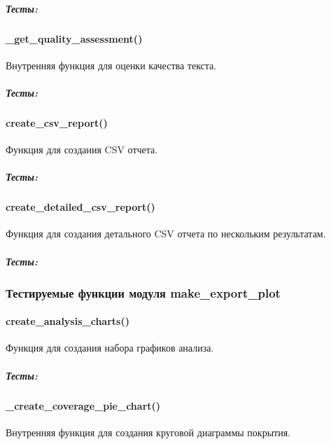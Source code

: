 \documentclass[a4paper,11pt,russian,openany,oneside]{sphinxmanual}
\begin{document}
\subparagraph{Тесты:}
\label{\detokenize{tests_module:id1}}

\paragraph{\_get\_quality\_assessment()}
\label{\detokenize{tests_module:get-quality-assessment}}
\sphinxAtStartPar
Внутренняя функция для оценки качества текста.


\subparagraph{Тесты:}
\label{\detokenize{tests_module:id2}}

\paragraph{create\_csv\_report()}
\label{\detokenize{tests_module:create-csv-report}}
\sphinxAtStartPar
Функция для создания CSV отчета.


\subparagraph{Тесты:}
\label{\detokenize{tests_module:id3}}

\paragraph{create\_detailed\_csv\_report()}
\label{\detokenize{tests_module:create-detailed-csv-report}}
\sphinxAtStartPar
Функция для создания детального CSV отчета по нескольким результатам.


\subparagraph{Тесты:}
\label{\detokenize{tests_module:id4}}

\subsubsection{Тестируемые функции модуля make\_export\_plot}
\label{\detokenize{tests_module:make-export-plot}}

\paragraph{create\_analysis\_charts()}
\label{\detokenize{tests_module:create-analysis-charts}}
\sphinxAtStartPar
Функция для создания набора графиков анализа.


\subparagraph{Тесты:}
\label{\detokenize{tests_module:id5}}

\paragraph{\_create\_coverage\_pie\_chart()}
\label{\detokenize{tests_module:create-coverage-pie-chart}}
\sphinxAtStartPar
Внутренняя функция для создания круговой диаграммы покрытия.
\end{document}

